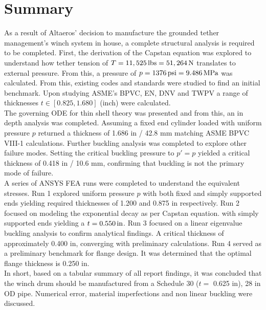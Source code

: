 \chapter{Summary}

As a result of Altaeros' decision to manufacture the grounded tether management's winch system in house, a complete structural analysis is required to be completed. First, the derivation of the Capstan equation was explored to understand how tether tension of $T=11,525 \,\mathrm{lbs} = 51,264\,\mathrm{N}$ translates to external pressure. From this, a pressure of $p=1376\,\mathrm{psi}= 9.486\,\mathrm{MPa}$ was calculated. From this, existing codes and standards were studied to find an initial benchmark. Upon studying ASME's BPVC, EN, DNV and TWPV a range of thicknesses $t\in [0.825, 1.680]$ (inch) were calculated. \\

The governing ODE for thin shell theory was presented and from this, an in depth analysis was completed. Assuming a fixed end cylinder loaded with uniform pressure $p$ returned a thickness of 1.686 in / 42.8 mm matching ASME BPVC VIII-1 calculations. Further buckling analysis was completed to explore other failure modes. Setting the critical buckling pressure to $p'=p$ yielded a critical thickness  of 0.418 in / 10.6 mm, confirming that buckling is not the primary mode of failure.\\

A series of ANSYS FEA runs were completed to understand the equivalent stresses. Run 1 explored uniform pressure $p$ with both fixed and simply supported ends yielding required thicknesses of 1.200 and 0.875 in respectively. Run 2 focused on modeling the exponential decay as per Capstan equation. with simply supported ends yielding a $t=0.550\,\mathrm{in}$. Run 3 focused on a linear eigenvalue buckling analysis to confirm analytical findings. A critical thickness of approximately 0.400 in, converging with preliminary calculations. Run 4 served as a preliminary benchmark for flange design. It was determined that the optimal flange thickness is 0.250 in.\\

In short, based on a tabular summary of all report findings, it was concluded that the winch drum should be manufactured from a Schedule 30 ($t=$ 0.625 in), 28 in OD pipe. Numerical error, material imperfections and non linear buckling were discussed.


